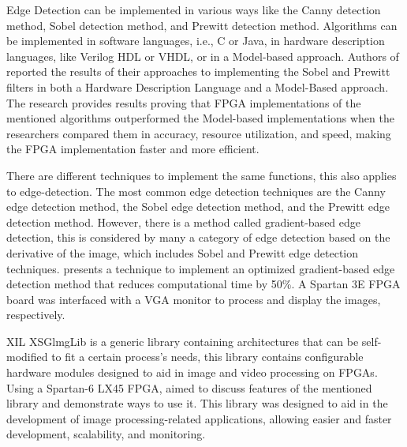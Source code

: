 \par	Edge Detection can be implemented in various ways like the Canny detection method, Sobel detection method, and Prewitt detection method. Algorithms can be implemented in software languages, i.e., C or Java, in hardware description languages, like Verilog HDL or VHDL, or in a Model-based approach. Authors of \cite{sixteen} reported the results of their approaches to implementing the Sobel and Prewitt filters in both a Hardware Description Language and a Model-Based approach. The research provides results proving that FPGA implementations of the mentioned algorithms outperformed the Model-based implementations when the researchers compared them in accuracy, resource utilization, and speed, making the FPGA implementation faster and more efficient. \newline
\par	There are different techniques to implement the same functions, this also applies to edge-detection. The most common edge detection techniques are the Canny edge detection method, the Sobel edge detection method, and the Prewitt edge detection method. However, there is a method called gradient-based edge detection, this is considered by many a category of edge detection based on the derivative of the image, which includes Sobel and Prewitt edge detection techniques. \cite{eighteen} presents a technique to implement an optimized gradient-based edge detection method that reduces computational time by 50\%. A Spartan 3E FPGA board was interfaced with a VGA monitor to process and display the images, respectively. \newline
\par	XIL XSGlmgLib is a generic library containing architectures that can be self-modified to fit a certain process’s needs, this library contains configurable hardware modules designed to aid in image and video processing on FPGAs. Using a Spartan-6 LX45 FPGA, \cite{twenty_six} aimed to discuss features of the mentioned library and demonstrate ways to use it. This library was designed to aid in the development of image processing-related applications, allowing easier and faster development, scalability, and monitoring. \newline

